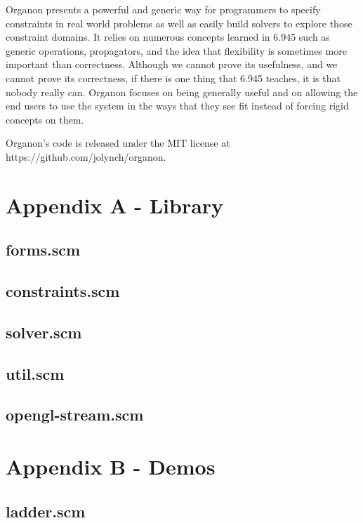 \documentclass[12pt,a4paper]{article}
\begin{document}
Organon presents a powerful and generic way for programmers to specify constraints in real world problems as well as easily build solvers to explore those constraint domains.  It relies on numerous concepts learned in 6.945 such as generic operations, propagators, and the idea that flexibility is sometimes more important than correctness.  Although we cannot prove its usefulness, and we cannot prove its correctness, if there is one thing that 6.945 teaches, it is that nobody really can.  Organon focuses on being generally useful and on allowing the end users to use the system in the ways that they see fit instead of forcing rigid concepts on them.
\newline
\newline

Organon's code is released under the MIT license at https://github.com/jolynch/organon.

\newpage

\appendix
\section{Appendix A - Library}\label{App:AppendixA}
\subsection{forms.scm}

\subsection{constraints.scm}

\subsection{solver.scm}

\subsection{util.scm}

\subsection{opengl-stream.scm}

\newpage

\section{Appendix B - Demos}\label{App:AppendixB}
\subsection{ladder.scm}

\end{document}
